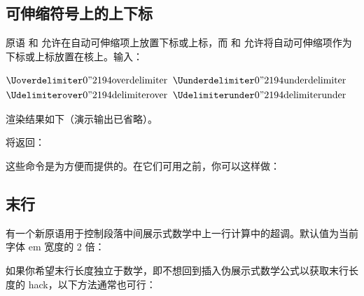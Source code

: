 \subsection{可伸缩符号上的上下标}


原语  和  允许在自动可伸缩项上放置下标或上标，而  和  允许将自动可伸缩项作为下标或上标放置在核上。输入：


\begin{typing}
$\Uoverdelimiter  0 "2194 {\hbox{\strut  overdelimiter}}$
$\Uunderdelimiter 0 "2194 {\hbox{\strut underdelimiter}}$
$\Udelimiterover  0 "2194 {\hbox{\strut  delimiterover}}$
$\Udelimiterunder 0 "2194 {\hbox{\strut delimiterunder}}$
\end{typing}

渲染结果如下（演示输出已省略）。

将返回：

\begin{typing}
[2] [3] [4]
\end{typing}

这些命令是为方便而提供的。在它们可用之前，你可以这样做：

\begin{typing}
\def\Umathcharclass{\directlua{tex.print(tex.getmathcode(token.scan_int())[1])}}
\def\Umathcharfam  {\directlua{tex.print(tex.getmathcode(token.scan_int())[2])}}
\def\Umathcharslot {\directlua{tex.print(tex.getmathcode(token.scan_int())[3])}}
\end{typing}

\subsection {末行}


有一个新原语用于控制段落中间展示式数学中上一行计算中的超调。默认值为当前字体 em 宽度的 2 倍：

\begin{typing}
\end{typing}

如果你希望末行长度独立于数学，即不想回到插入伪展示式数学公式以获取末行长度的 hack，以下方法通常也可行：

